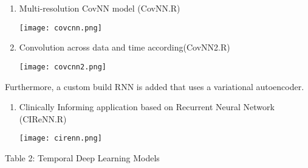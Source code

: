 \documentclass[]{article}
\begin{document}
\begin{enumerate}
\def\labelenumi{\arabic{enumi}.}
\item
  Multi-resolution CovNN model (CovNN.R)

  \texttt{[image: covcnn.png]}
\item
  Convolution across data and time according(CovNN2.R)

  \texttt{[image: covcnn2.png]}

  \newpage
\end{enumerate}

Furthermore, a custom build RNN is added that uses a variational
autoencoder.

\begin{enumerate}
\def\labelenumi{\arabic{enumi}.}
\setcounter{enumi}{2}
\item
  Clinically Informing application based on Recurrent Neural Network
  (CIReNN.R)

  \texttt{[image: cirenn.png]}
\end{enumerate}

Table 2: Temporal Deep Learning Models
\end{document}
